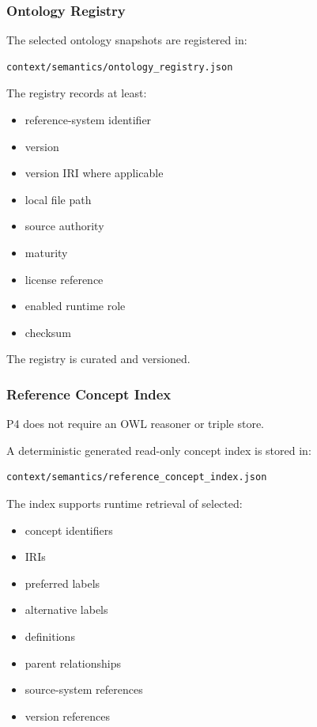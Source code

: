 \hypertarget{ontology-registry}{%
\subsubsection{Ontology Registry}\label{ontology-registry}}

The selected ontology snapshots are registered in:

\begin{verbatim}
context/semantics/ontology_registry.json
\end{verbatim}

The registry records at least:

\begin{itemize}
\tightlist
\item
  reference-system identifier
\item
  version
\item
  version IRI where applicable
\item
  local file path
\item
  source authority
\item
  maturity
\item
  license reference
\item
  enabled runtime role
\item
  checksum
\end{itemize}

The registry is curated and versioned.

\hypertarget{reference-concept-index}{%
\subsubsection{Reference Concept Index}\label{reference-concept-index}}

P4 does not require an OWL reasoner or triple store.

A deterministic generated read-only concept index is stored in:

\begin{verbatim}
context/semantics/reference_concept_index.json
\end{verbatim}

The index supports runtime retrieval of selected:

\begin{itemize}
\tightlist
\item
  concept identifiers
\item
  IRIs
\item
  preferred labels
\item
  alternative labels
\item
  definitions
\item
  parent relationships
\item
  source-system references
\item
  version references
\end{itemize}

